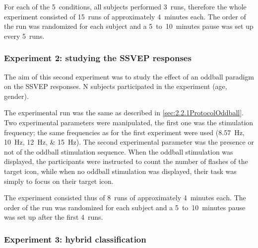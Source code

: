 \documentclass[10pt]{article}
\begin{document}
        For each of the 5~conditions, all subjects performed 3~runs, therefore the whole experiment consisted of 15~runs of approximately 4~minutes each.
        The order of the run was randomized for each subject and a 5~to~10~minutes pause was set up every 5~runs.


        \subsubsection{Experiment 2: studying the \acs{SSVEP} responses}
        \label{sec:2.2.2ProtocolSSVEP}

        The aim of this second experiment was to study the effect of an oddball paradigm on the \ac{SSVEP} responses.
        N subjects participated in the experiment (age, gender).

        The experimental run was the same as described in \autoref{sec:2.2.1ProtocolOddball}.
        Two experimental parameters were manipulated, the first one was the stimulation frequency; the same frequencies as for the first experiment were used (\SIlist[list-units = single]{8.57;10;12;15}{\Hz}).
        The second experimental parameter was the presence or not of the oddball stimulation sequence.
        When the oddball stimulation was displayed, the participants were instructed to count the number of flashes of the target icon, while when no oddball stimulation was displayed, their task was simply to focus on their target icon.

        The experiment consisted thus of 8~runs of approximately 4~minutes each.
        The order of the run was randomized for each subject and a 5~to~10~minutes pause was set up after the first 4~runs.


        \subsubsection{Experiment 3: hybrid classification}
        \label{sec:2.2.3ProtocolHybrid}
\end{document}
